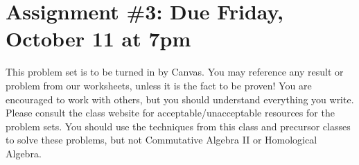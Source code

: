 \documentclass[12pt]{amsart}
\newcommand{\showsol}[1]{\def\displaysol{#1}}
\begin{document}
\showsol{1}
	
	\thispagestyle{empty}
	
	\section*{Assignment \#3: Due Friday, October 11 at 7pm}
	
	This problem set is to be turned in by Canvas. You may reference any result or problem from our worksheets, unless it is the fact to be proven! You are encouraged to work with others, but you should understand everything you write. Please consult the class website for acceptable/unacceptable resources for the problem sets. You should use the techniques from this class and precursor classes to solve these problems, but not Commutative Algebra II or Homological Algebra.
	
	
	\
	
\end{document}
